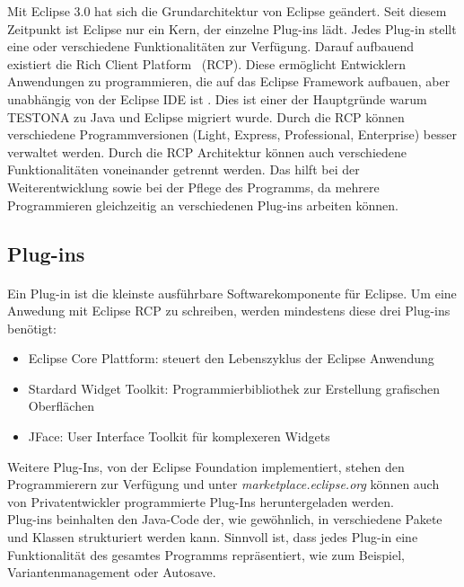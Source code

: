 Mit Eclipse 3.0 hat sich die Grundarchitektur von Eclipse geändert. Seit diesem Zeitpunkt ist Eclipse nur ein Kern, der einzelne Plug-ins lädt. Jedes Plug-in stellt eine oder verschiedene Funktionalitäten zur Verfügung. Darauf aufbauend existiert die \glqq Rich Client Platform\grqq~ (RCP). Diese ermöglicht Entwicklern Anwendungen zu programmieren, die auf das Eclipse Framework aufbauen, aber unabhängig von der Eclipse IDE ist\cite{EclipseRCP} \cite{Eclipse}. Dies ist einer der Hauptgründe warum TESTONA zu Java und Eclipse migriert wurde. Durch die RCP können verschiedene Programmversionen (Light, Express, Professional, Enterprise) besser verwaltet werden. Durch die RCP Architektur können auch verschiedene Funktionalitäten voneinander getrennt werden. Das hilft bei der Weiterentwicklung sowie bei der Pflege des Programms, da mehrere Programmieren gleichzeitig an verschiedenen Plug-ins arbeiten können.\\



\subsection{Plug-ins}
\paragraph{}
Ein Plug-in ist die kleinste ausführbare Softwarekomponente für Eclipse. Um eine Anwedung mit Eclipse RCP zu schreiben, werden mindestens diese drei Plug-ins benötigt:
\begin{itemize}
\item Eclipse Core Plattform: steuert den Lebenszyklus der Eclipse Anwendung
\item Stardard Widget Toolkit: Programmierbibliothek zur Erstellung grafischen Oberflächen
\item JFace: User Interface Toolkit für komplexeren Widgets
\end{itemize}

Weitere Plug-Ins, von der Eclipse Foundation implementiert, stehen den Programmierern zur Verfügung und unter \textit{marketplace.eclipse.org} können auch von Privatentwickler programmierte Plug-Ins heruntergeladen werden. \cite{Eclipse}\\

Plug-ins beinhalten den Java-Code der, wie gewöhnlich, in verschiedene Pakete und Klassen strukturiert werden kann. Sinnvoll ist, dass jedes Plug-in eine Funktionalität des gesamtes Programms repräsentiert, wie zum Beispiel, Variantenmanagement oder Autosave.\\

